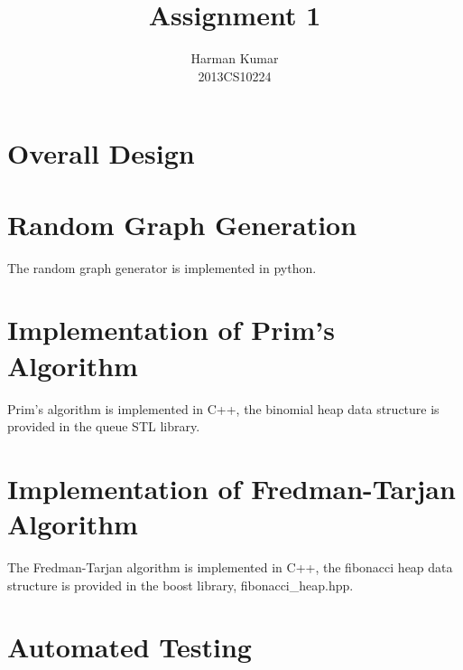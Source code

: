 \documentclass[]{article}
\begin{document}
\author{
		Harman Kumar\\
		2013CS10224		
		}

\title{Assignment 1}
\maketitle







\section{Overall Design}

\begin{flushleft}


\end{flushleft} 



\section{Random Graph Generation}
\begin{flushleft}
	The random graph generator is implemented in python.
	
\end{flushleft}

\section{Implementation of Prim's Algorithm}
\begin{flushleft}
	Prim's algorithm is implemented in C++, the binomial heap data structure is provided in the queue STL library.  
\end{flushleft} 

\section{Implementation of Fredman-Tarjan Algorithm}
\begin{flushleft}
	The Fredman-Tarjan algorithm is implemented in C++, the fibonacci heap data structure is provided in the boost library, fibonacci\_heap.hpp.  
\end{flushleft} 

\section{Automated Testing}
\end{document}
